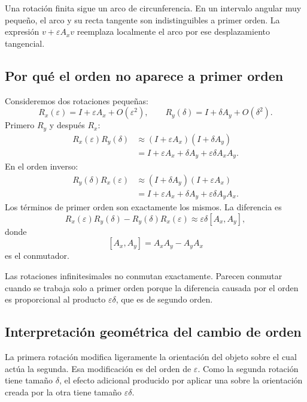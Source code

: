 \begin{idea}
Una rotación finita sigue un arco de circunferencia. En un intervalo angular muy pequeño,
el arco y su recta tangente son indistinguibles a primer orden. La expresión
\(v+\varepsilon A_xv\) reemplaza localmente el arco por ese desplazamiento tangencial.
\end{idea}

\subsection{Por qué el orden no aparece a primer orden}

Consideremos dos rotaciones pequeñas:
\[
R_x(\varepsilon)=I+\varepsilon A_x+O(\varepsilon^2),
\qquad
R_y(\delta)=I+\delta A_y+O(\delta^2).
\]
Primero \(R_y\) y después \(R_x\):
\[
\begin{aligned}
R_x(\varepsilon)R_y(\delta)
&\approx(I+\varepsilon A_x)(I+\delta A_y)\\
&=I+\varepsilon A_x+\delta A_y+\varepsilon\delta A_xA_y.
\end{aligned}
\]
En el orden inverso:
\[
\begin{aligned}
R_y(\delta)R_x(\varepsilon)
&\approx(I+\delta A_y)(I+\varepsilon A_x)\\
&=I+\varepsilon A_x+\delta A_y+\varepsilon\delta A_yA_x.
\end{aligned}
\]
Los términos de primer orden son exactamente los mismos. La diferencia es
\[
\boxed{
R_x(\varepsilon)R_y(\delta)
-R_y(\delta)R_x(\varepsilon)
\approx\varepsilon\delta[A_x,A_y]
},
\]
donde
\[
  [A_x,A_y]=A_xA_y-A_yA_x
\]
es el conmutador.

\begin{resultado}
Las rotaciones infinitesimales no conmutan exactamente. Parecen conmutar cuando se trabaja
solo a primer orden porque la diferencia causada por el orden es proporcional al producto
\(\varepsilon\delta\), que es de segundo orden.
\end{resultado}

\subsection{Interpretación geométrica del cambio de orden}

La primera rotación modifica ligeramente la orientación del objeto sobre el cual actúa la
segunda. Esa modificación es del orden de \(\varepsilon\). Como la segunda rotación tiene
tamaño \(\delta\), el efecto adicional producido por aplicar una sobre la orientación creada
por la otra tiene tamaño \(\varepsilon\delta\).


